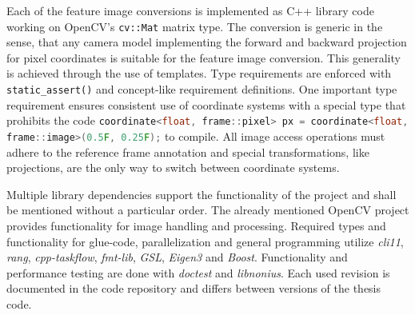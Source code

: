 Each of the feature image conversions is implemented as C++ library code working on OpenCV's\cite{opencv_library} \lstinline[basicstyle=\ttfamily]|cv::Mat| matrix type.
The conversion is generic in the sense, that any camera model implementing the forward and backward projection for pixel coordinates is suitable for the feature image conversion.
This generality is achieved through the use of templates.
Type requirements are enforced with \lstinline[basicstyle=\ttfamily]|static_assert()| and concept-like\cite{c++concepts} requirement definitions.
One important type requirement ensures consistent use of coordinate systems with a special type that prohibits the code \texttt{\lstinline[language=C++,basicstyle=\footnotesize\ttfamily]|coordinate<float, frame::pixel> px = coordinate<float, frame::image>(0.5F, 0.25F);|} to compile.
All image access operations must adhere to the reference frame annotation and special transformations, like projections, are the only way to switch between coordinate systems.

Multiple library dependencies support the functionality of the project and shall be mentioned without a particular order.
The already mentioned OpenCV\cite{opencv_library} project provides functionality for image handling and processing. 
Required types and functionality for glue-code, parallelization and general programming utilize \emph{cli11}\cite{cli11}, \emph{rang}\cite{rang}, \emph{cpp-taskflow}\cite{Huang2019CppTaskflowFT}, \emph{fmt-lib}\cite{fmtlib}, \emph{GSL}\cite{gsl}, \emph{Eigen3}\cite{eigenweb} and \emph{Boost}\cite{boost}.
Functionality and performance testing are done with \emph{doctest}\cite{doctest} and \emph{libnonius}\cite{libnonius}.
Each used revision is documented in the code repository and differs between versions of the thesis code.
